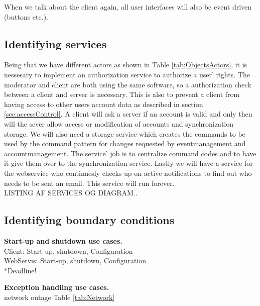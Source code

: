 \documentclass[a4paper]{article}
\begin{document}
When we talk about the client again, all user interfaces will also be event driven (buttons etc.). \\


\subsection{Identifying services}

Being that we have different actors as shown in Table \ref{tab:ObjectsActors}, it is nessesary to implement an authorization service to authorize a user’ rights. The moderator and client are both using the same software, so a authorization check between a client and server is necessary. This is also to prevent a client from having access to other users account data as described in section \ref{sec:accessControl}. A client will ask a server if an account is valid and only then will the sever allow access or modification of accounts and synchronization storage.
We will also need a storage service which creates the commands to be used by the command pattern for changes requested by eventmanagement and accountmanagement. The service’ job is to centralize command codes and to have it give them over to the synchronization service.
Lastly we will have a service for the webservice who continuesly checks up on active notifications to find out who needs to be sent an email. This service will run forever.\\

LISTING AF SERVICES OG DIAGRAM..\\

\subsection{Identifying boundary conditions}

\textbf{Start-up and shutdown use cases.}\\

Client:
	Start-up,
    shutdown,
    Configuration\\
    
WebServis:
	Start-up,
    shutdown,
    Configuration\\

*Deadline!

\textbf{Exception handling use cases.}\\

network outage Table \ref{tab:Network}\\
\end{document}
